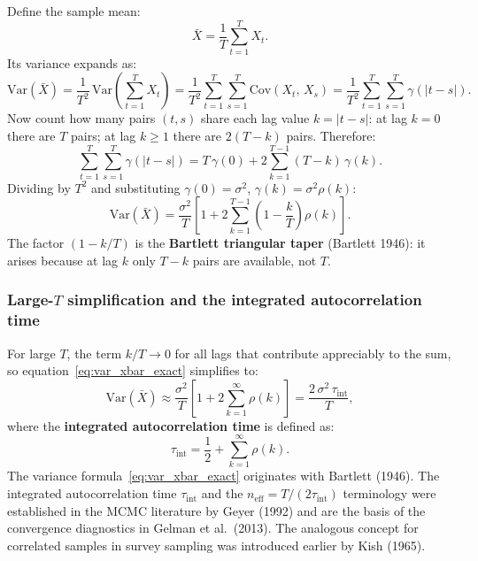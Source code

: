 \documentclass[11pt, a4paper]{article}
\begin{document}
Define the sample mean:
\begin{equation}
    \bar{X} = \frac{1}{T}\sum_{t=1}^{T} X_t.
\end{equation}
Its variance expands as:
\begin{equation}
    \mathrm{Var}(\bar{X})
    = \frac{1}{T^2}\,\mathrm{Var}\!\left(\sum_{t=1}^T X_t\right)
    = \frac{1}{T^2}\sum_{t=1}^T\sum_{s=1}^T \mathrm{Cov}(X_t,\,X_s)
    = \frac{1}{T^2}\sum_{t=1}^T\sum_{s=1}^T \gamma(|t-s|).
\end{equation}
Now count how many pairs $(t,s)$ share each lag value $k = |t-s|$:
at lag $k=0$ there are $T$ pairs; at lag $k \geq 1$ there are $2(T-k)$ pairs.
Therefore:
\begin{equation}
    \sum_{t=1}^T\sum_{s=1}^T \gamma(|t-s|)
    = T\,\gamma(0) + 2\sum_{k=1}^{T-1}(T-k)\,\gamma(k).
\end{equation}
Dividing by $T^2$ and substituting $\gamma(0) = \sigma^2$,
$\gamma(k) = \sigma^2\rho(k)$:
\begin{equation}
    \boxed{
        \mathrm{Var}(\bar{X})
        = \frac{\sigma^2}{T}\!\left[1 + 2\sum_{k=1}^{T-1}\!\left(1-\frac{k}{T}\right)\rho(k)\right].
    }
    \label{eq:var_xbar_exact}
\end{equation}
The factor $(1 - k/T)$ is the \textbf{Bartlett triangular taper} (Bartlett 1946):
it arises because at lag $k$ only $T-k$ pairs are available, not $T$.

\subsubsection*{Large-$T$ simplification and the integrated autocorrelation time}

For large $T$, the term $k/T \to 0$ for all lags that contribute appreciably to the
sum, so equation~\eqref{eq:var_xbar_exact} simplifies to:
\begin{equation}
    \mathrm{Var}(\bar{X}) \approx \frac{\sigma^2}{T}\!\left[1 + 2\sum_{k=1}^{\infty}\rho(k)\right]
    = \frac{2\,\sigma^2\,\tau_\mathrm{int}}{T},
\end{equation}
where the \textbf{integrated autocorrelation time} is defined as:
\begin{equation}
    \tau_\mathrm{int} = \frac{1}{2} + \sum_{k=1}^{\infty}\rho(k).
    \label{eq:tauint}
\end{equation}
The variance formula~\eqref{eq:var_xbar_exact} originates with Bartlett (1946).
The integrated autocorrelation time $\tau_\mathrm{int}$ and the
$n_\mathrm{eff} = T/(2\tau_\mathrm{int})$ terminology were established in the
MCMC literature by Geyer (1992) and are the basis of the convergence diagnostics
in Gelman et al.\ (2013).
The analogous concept for correlated samples in survey sampling was introduced
earlier by Kish (1965).
\end{document}
